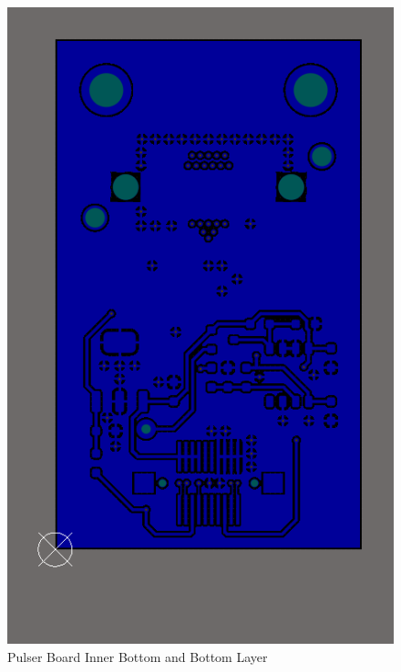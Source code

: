 \documentclass[a4paper,11pt]{article}
\begin{document}
\begin{figure}[htbp]
\includegraphics[scale=0.5]{PulserBoard0.9BottomLayer.png}
\caption{Pulser Board Inner Bottom and Bottom Layer\label{fig:PulserBoard0.9BottomLayers}}
\end{figure}
\end{document}
